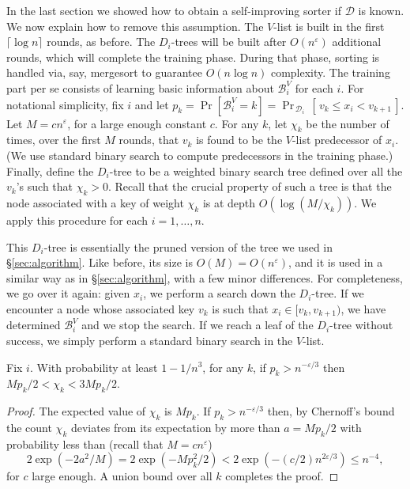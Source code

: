 \documentclass{siamltex}
\newcommand{\D}{\mathcal{D}}
\newcommand{\eps}{\varepsilon}
\newcommand{\pred}{\mathcal{B}}
\begin{document}
In the last section we showed how to obtain a self-improving
sorter if $\D$ is known. We now explain how to remove this assumption.
The $V$-list is built in the first $\lceil \log n \rceil$ rounds, as
before.
The $D_i$-trees will be built after $O(n^\eps)$ additional rounds,
which will complete the training phase. During that phase,
sorting is handled via, say, mergesort to guarantee $O(n\log n)$ complexity.
The training part per se consists of learning basic information
about $\pred_i^V$ for each $i$. For notational simplicity, fix $i$
and let $p_{k}=  \Pr[\pred_i^V = k] = 
\Pr_{\, \D_i}\,[\, v_k \leq x_i < v_{k+1}\,]$.
Let $M = c n^\eps$, for a large enough constant $c$.
For any $k$, let $\chi_k$ be the number of times, 
over the first $M$ rounds, that $v_k$ is
found to be the $V$-list predecessor of $x_i$. (We use
standard binary search to compute predecessors in the training phase.)
Finally, define the $D_i$-tree to be a
weighted binary search tree defined over all the $v_k$'s such that
$\chi_k>0$. Recall that the crucial property of such
a tree is that the node associated with a key of weight $\chi_k$
is at depth $O(\log (M/\chi_k))$. 
We apply this procedure for each $i=1,\ldots, n$.

This $D_i$-tree is essentially the pruned version
of the tree we used in \S \ref{sec:algorithm}. Like before, its size is
$O(M)= O(n^\eps)$, and it is used in a similar
way as in \S \ref{sec:algorithm}, with a few minor differences. For 
completeness, we go over it again: given $x_i$, we perform a search down the $D_i$-tree. If we encounter a node
whose associated key $v_k$ is such that $x_i\in [v_k,v_{k+1})$,
we have determined $\pred_i^V$  and we stop the search.
If we reach a leaf of the $D_i$-tree without success, we
simply perform a standard binary search in the $V$-list.
\medskip
\begin{lemma} \label{lem:learn} 
Fix $i$. With probability at least $1-1/n^3$, for any $k$,
if $p_k > n^{-\eps/3}$ then $Mp_k/2 < \chi_k < 3Mp_k/2$.
\end{lemma}

\begin{proof}
The expected value of $\chi_k$ is $Mp_k$. If $p_k> n^{-\eps/3}$
then, by Chernoff's bound~\cite[Corollary~A.17]{AlonS} 
the count $\chi_k$ deviates from its expectation by more than 
$a = Mp_k/2$ with probability less than (recall that $M = cn^{\eps}$)
\[
2\exp(-2a^2/M) = 2\exp(-Mp_k^2/2) < 
2\exp(-(c/2)n^{2\eps/3}) \leq n^{-4},
\]
for $c$ large enough.
A union bound over all $k$ completes the proof.
\end{proof}
\medskip
\end{document}
